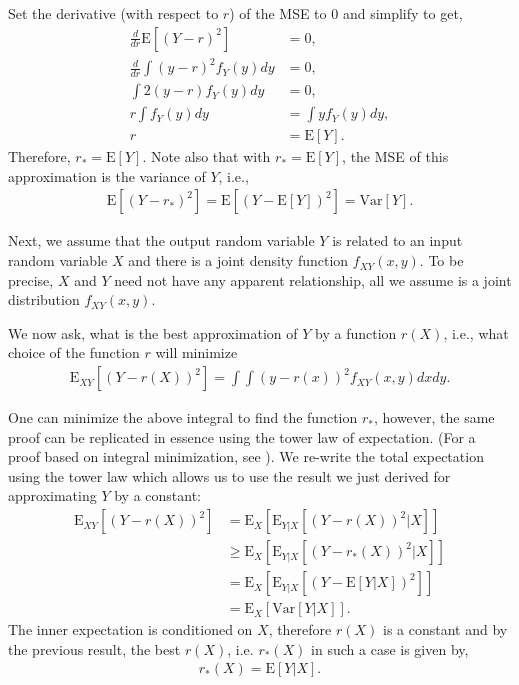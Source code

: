 \documentclass{amsart}
\theoremstyle{plain}
\numberwithin{equation}{section}
\begin{document}
Set the derivative (with respect to $r$) of the MSE to $0$ and simplify to get,
\begin{align*}
\frac{d}{dr} \mathrm{E}[(Y-r)^2] &= 0,\\
\frac{d}{dr}\int (y-r)^2f_Y(y) dy &= 0,\\
\int 2(y-r)f_Y(y) dy &= 0,\\
r \int f_Y(y) dy &= \int y f_Y(y) dy,\\
r &= \mathrm{E}[Y].
\end{align*}
Therefore, $r_* = \mathrm{E}[Y]$. 
Note also that with $r_*=\mathrm{E}[Y]$, the MSE of this approximation 
is the variance of $Y$, i.e.,
\begin{align*}
\mathrm{E}[(Y-r_*)^2] = \mathrm{E}[(Y-\mathrm{E}[Y])^2]=\mathrm{Var}[Y].
\end{align*}

Next, we assume that the output random variable $Y$ is 
related to an input random variable $X$ and
there is a joint density function $f_{XY}(x,y)$. 
To be precise, $X$ and $Y$ need not have any apparent
relationship, all we assume is a joint distribution
$f_{XY}(x,y)$.

We now ask, what is the best approximation of $Y$ by a function $r(X)$, i.e., what choice 
of the function $r$ will minimize
\begin{align*}
\mathrm{E}_{XY}[(Y-r(X))^2] = \int \int (y-r(x))^2 f_{XY}(x, y) dx dy.
\end{align*}

One can minimize the above integral to find the function $r_*$, however, the same 
proof can be replicated in essence using the tower law of 
expectation. (For a proof based on integral minimization, see \cite[pp. 263]{papoulis2002probability}). We re-write the total expectation 
using the tower law which allows us to use the result we just derived
for approximating $Y$ by a constant:
\begin{align*}
\mathrm{E}_{XY}[(Y-r(X))^2] &= \mathrm{E}_X[\mathrm{E}_{Y|X}[(Y-r(X))^2|X]]\\
&\geq \mathrm{E}_X[\mathrm{E}_{Y|X}[(Y-r_*(X))^2|X]]\\
&= \mathrm{E}_X[\mathrm{E}_{Y|X}[(Y-\mathrm{E}[Y|X])^2]]\\
&= \mathrm{E}_X[\mathrm{Var}[Y|X]].
\end{align*}
The inner expectation is conditioned on $X$, therefore $r(X)$ is a constant and by the previous 
result, the best $r(X)$, i.e. $r_*(X)$ in such a case is given by,
\begin{align*}
r_*(X) = \mathrm{E}[Y|X].
\end{align*}
\end{document}

